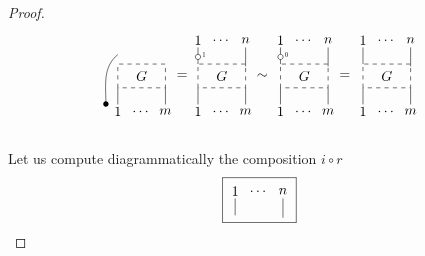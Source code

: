 \documentclass{amsart}
\renewcommand{\1}{\mathbf{1}}
\theoremstyle{definition}
\begin{document}
\begin{proof}
\begin{equation*}
{\begin{tikzpicture}[scale=.6]
		\draw [dashed] (0,0) rectangle (2,1); \node at (1, .5) {$G$};
		
		\node at (-.5,-.7) {$\bullet$}; \draw (-.5,-.7)  to[out=90,in=-140]  (0,1.4);
		\node at (0,-1) {$1$}; \draw (0,-.7) -- (0,0);
		\node at (1,-1) {$\dots$};
		\node at (2,-1) {$m$}; \draw (2,-.7) -- (2,0);
		\node at (2.7,.5) {$=$}; 
		\end{tikzpicture}
		\!
		\begin{tikzpicture}[scale=.6]
		\node at (0,2) {$1$}; \draw (0,1.7) -- (0,1);
		\draw [fill=white] (0,1.3) circle [radius=0.11];
		\node at (.25,1.4)[scale = .5]{$1$};
		\node at (1,2) {$\dots$};
		\node at (2,2) {$n$}; \draw (2,1.7) -- (2,.9);
		
		\draw [dashed] (0,0) rectangle (2,1); \node at (1, .5) {$G$};
		
		\node at (0,-1) {$1$}; \draw (0,-.7) -- (0,0);
		\node at (1,-1) {$\dots$};
		\node at (2,-1) {$m$}; \draw (2,-.7) -- (2,0);
		\node at (2.7,.5) {$\sim$}; 
		\end{tikzpicture}
		\begin{tikzpicture}[scale=.6]
		\node at (0,2) {$1$}; \draw (0,1.7) -- (0,1);
		\draw [fill=white] (0,1.3) circle [radius=0.11];
		\node at (.25,1.4)[scale = .5]{$0$};
		\node at (1,2) {$\dots$};
		\node at (2,2) {$n$}; \draw (2,1.7) -- (2,.9);
		
		\draw [dashed] (0,0) rectangle (2,1); \node at (1, .5) {$G$};
		
		\node at (0,-1) {$1$}; \draw (0,-.7) -- (0,0);
		\node at (1,-1) {$\dots$};
		\node at (2,-1) {$m$}; \draw (2,-.7) -- (2,0);
		\node at (2.7,.5) {$=$}; 
		\end{tikzpicture}
		\begin{tikzpicture}[scale=.6]
		\node at (0,2) {$1$}; \draw (0,1.7) -- (0,1);
		\node at (1,2) {$\dots$};
		\node at (2,2) {$n$}; \draw (2,1.7) -- (2,.9);
		
		\draw [dashed] (0,0) rectangle (2,1); \node at (1, .5) {$G$};
		
		\node at (0,-1) {$1$}; \draw (0,-.7) -- (0,0);
		\node at (1,-1) {$\dots$};
		\node at (2,-1) {$m$}; \draw (2,-.7) -- (2,0);
		\end{tikzpicture}
	}
	\end{equation*}\\
	Let us compute diagrammatically the composition $i\circ r$\\
	\begin{equation*}
	\boxed{\begin{tikzpicture}[scale=.6]
		\node at (0,2) {$1$}; \draw (0,1.7) -- (0,1);
		\node at (1,2) {$\dots$};
		\node at (2,2) {$n$}; \draw (2,1.7) -- (2,.9);
		

\end{tikzpicture}}
\end{equation*}
\end{proof}
\end{document}
